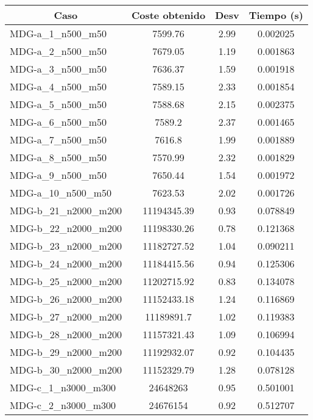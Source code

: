 \documentclass[10pt,a4paper]{article}
\begin{document}
\begin{table}[H]
	\begin{center}
\begin{tabular}{|l|c|c|c|} 
	\hline
	\multicolumn{1}{|c|}{\textbf{Caso}} & \textbf{Coste obtenido} & \textbf{Desv} & \textbf{Tiempo (s)} \\ \hline
			MDG-a\_1\_n500\_m50 & 7599.76 & 2.99 & 0.002025 \\ \hline
			MDG-a\_2\_n500\_m50 & 7679.05 & 1.19 & 0.001863 \\ \hline
			MDG-a\_3\_n500\_m50 & 7636.37 & 1.59 & 0.001918 \\ \hline
			MDG-a\_4\_n500\_m50 & 7589.15 & 2.33 & 0.001854 \\ \hline
			MDG-a\_5\_n500\_m50 & 7588.68 & 2.15 & 0.002375 \\ \hline
			MDG-a\_6\_n500\_m50 & 7589.2 & 2.37 & 0.001465 \\ \hline
			MDG-a\_7\_n500\_m50 & 7616.8 & 1.99 & 0.001889 \\ \hline
			MDG-a\_8\_n500\_m50 & 7570.99 & 2.32 & 0.001829 \\ \hline
			MDG-a\_9\_n500\_m50 & 7650.44 & 1.54 & 0.001972 \\ \hline
			MDG-a\_10\_n500\_m50 & 7623.53 & 2.02 & 0.001726 \\ \hline
			MDG-b\_21\_n2000\_m200 & 11194345.39 & 0.93 & 0.078849 \\ \hline
			MDG-b\_22\_n2000\_m200 & 11198330.26 & 0.78 & 0.121368 \\ \hline
			MDG-b\_23\_n2000\_m200 & 11182727.52 & 1.04 & 0.090211 \\ \hline
			MDG-b\_24\_n2000\_m200 & 11184415.56 & 0.94 & 0.125306 \\ \hline
			MDG-b\_25\_n2000\_m200 & 11202715.92 & 0.83 & 0.134078 \\ \hline
			MDG-b\_26\_n2000\_m200 & 11152433.18 & 1.24 & 0.116869 \\ \hline
			MDG-b\_27\_n2000\_m200 & 11189891.7 & 1.02 & 0.119383 \\ \hline
			MDG-b\_28\_n2000\_m200 & 11157321.43 & 1.09 & 0.106994 \\ \hline
			MDG-b\_29\_n2000\_m200 & 11192932.07 & 0.92 & 0.104435 \\ \hline
			MDG-b\_30\_n2000\_m200 & 11152329.79 & 1.28 & 0.078128 \\ \hline
			MDG-c\_1\_n3000\_m300 & 24648263 & 0.95 & 0.501001 \\ \hline
			MDG-c\_2\_n3000\_m300 & 24676154 & 0.92 & 0.512707 \\ \hline

\end{tabular}
\end{center}
\end{table}
\end{document}
